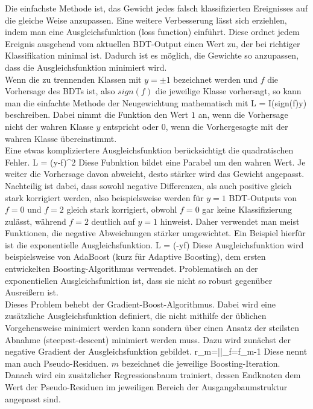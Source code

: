 Die einfachste Methode ist, das Gewicht jedes falsch klassifizierten Ereignisses auf die gleiche Weise anzupassen. Eine weitere Verbesserung l\"asst sich erziehlen, indem man eine Ausgleichsfunktion (loss function) einf\"uhrt. Diese ordnet jedem Ereignis ausgehend vom aktuellen BDT-Output einen Wert zu, der bei richtiger Klassifikation minimal ist. Dadurch ist es m\"oglich, die Gewichte so anzupassen, dass die Ausgleichsfunktion minimiert wird.\\
Wenn die zu trennenden Klassen mit $y=\pm1$ bezeichnet werden und $f$ die Vorhersage des BDTs ist, also $sign(f)$ die jeweilige Klasse vorhersagt, so kann man die einfachte Methode der Neugewichtung mathematisch mit
\beq
L = I(sign(f)\neq y)
\label{eq:missclass_loss}
\eeq
beschreiben. Dabei nimmt die Funktion den Wert $1$ an, wenn die Vorhersage nicht der wahren Klasse $y$ entspricht oder $0$, wenn die Vorhergesagte mit der wahren Klasse \"ubereinstimmt.\\
Eine etwas kompliziertere Ausgleichsfunktion ber\"ucksichtigt die quadratischen Fehler.
\beq
L = (y-f)^2
\label{eq:squarederror_loss}
\eeq
Diese Fubnktion bildet eine Parabel um den wahren Wert. Je weiter die Vorhersage davon abweicht, desto st\"arker wird das Gewicht angepasst. Nachteilig ist dabei, dass sowohl negative Differenzen, als auch positive gleich stark korrigiert werden, also beispielsweise werden f\"ur $y=1$ BDT-Outputs von $f=0$ und $f=2$ gleich stark korrigiert, obwohl $f=0$ gar keine Klassifizierung zul\"asst, w\"ahrend $f=2$ deutlich auf $y=1$ hinweist. Daher verwendet man meist Funktionen, die negative Abweichungen st\"arker umgewichtet. Ein Beispiel hierf\"ur ist die exponentielle Ausgleichsfunktion.
\beq
L = \exp(-y\cdot f)
\label{eq:exp_loss}
\eeq
Diese Ausgleichsfunktion wird beispielsweise von AdaBoost (kurz f\"ur Adaptive Boosting), dem ersten entwickelten Boosting-Algorithmus verwendet. Problematisch an der exponentiellen Ausgleichsfunktion ist, dass sie nicht so robust gegen\"uber Ausrei\ss ern ist.\\
Dieses Problem behebt der Gradient-Boost-Algorithmus. Dabei wird eine zus\"atzliche Ausgleichsfunktion definiert, die nicht mithilfe der \"ublichen Vorgehensweise minimiert werden kann sondern \"uber einen Ansatz der steilsten Abnahme (steepest-descent) minimiert werden muss. Dazu wird zun\"achst der negative Gradient der Ausgleichsfunktion gebildet.
\beq
r_m=\left|\right|_{f=f_{m-1}}
\label{eq:pseudo_residual}
\eeq
Diese nennt man auch Pseudo-Residuen. $m$ bezeichnet die jeweilige Boosting-Iteration. Danach wird ein zus\"atzlicher Regressionsbaum trainiert, dessen Endknoten dem Wert der Pseudo-Residuen im jeweiligen Bereich der Ausgangsbaumstruktur angepasst sind. \cite{Hocker:2007ht}

